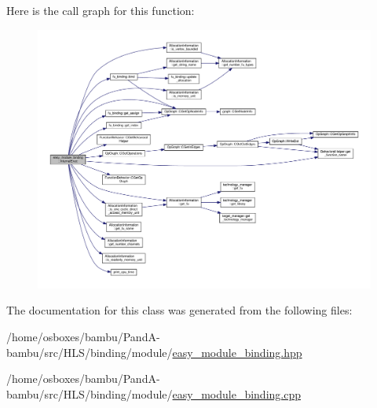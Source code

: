 Here is the call graph for this function\+:
\nopagebreak
\begin{figure}[H]
\begin{center}
\leavevmode
\includegraphics[width=350pt]{d6/d61/classeasy__module__binding_a679ec36974c9d93a34c944f62f7e0170_cgraph}
\end{center}
\end{figure}


The documentation for this class was generated from the following files\+:\begin{DoxyCompactItemize}
\item 
/home/osboxes/bambu/\+Pand\+A-\/bambu/src/\+H\+L\+S/binding/module/\hyperlink{easy__module__binding_8hpp}{easy\+\_\+module\+\_\+binding.\+hpp}\item 
/home/osboxes/bambu/\+Pand\+A-\/bambu/src/\+H\+L\+S/binding/module/\hyperlink{easy__module__binding_8cpp}{easy\+\_\+module\+\_\+binding.\+cpp}\end{DoxyCompactItemize}
